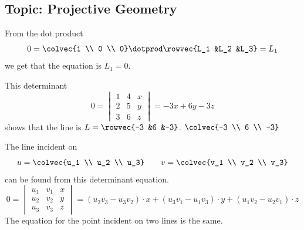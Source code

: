 \subsection{Topic: Projective Geometry}
\begin{ans}{1}
      From the dot product
      \begin{equation*}
        0=\colvec{1 \\ 0 \\ 0}\dotprod\rowvec{L_1 &L_2 &L_3}
         =L_1
      \end{equation*}
      we get that the equation is $L_1=0$.
    
\end{ans}
\begin{ans}{2}
      \begin{exparts}
        \partsitem This determinant
          \begin{equation*}
            0=\begin{vmatrix}
              1  &4  &x \\
              2  &5  &y \\
              3  &6  &z
            \end{vmatrix}
            =-3x+6y-3z
          \end{equation*}
          shows that the line is $L=\rowvec{-3 &6 &-3}$.
        \partsitem $\colvec{-3 \\ 6 \\ -3}$
      \end{exparts}
    
\end{ans}
\begin{ans}{3}
      The line incident on
      \begin{equation*}
        u=\colvec{u_1 \\ u_2 \\ u_3}
        \qquad
        v=\colvec{v_1 \\ v_2 \\ v_3}
      \end{equation*}
      can be found from this determinant equation.
      \begin{equation*}
        0=\begin{vmatrix}
          u_1  &v_1  &x  \\
          u_2  &v_2  &y  \\
          u_3  &v_3  &z
        \end{vmatrix}
        =(u_2v_3-u_3v_2)\cdot x
          + (u_3v_1-u_1v_3)\cdot y
          + (u_1v_2-u_2v_1)\cdot z
      \end{equation*}
      The equation for the point incident on two lines is the same.
    
\end{ans}
